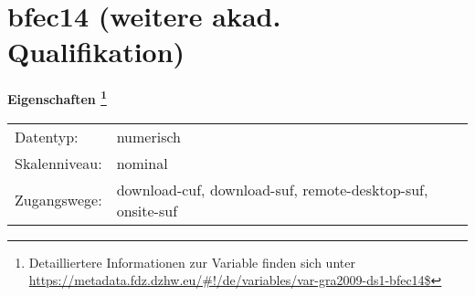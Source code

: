 
    \setcounter{footnote}{0}

    \vspace*{-1.8cm}
	\section{bfec14 (weitere akad. Qualifikation)}
	\label{section:bfec14}



    \vspace*{0.5cm}
    \noindent\textbf{Eigenschaften
	\footnote{Detailliertere Informationen zur Variable finden sich unter
		\url{https://metadata.fdz.dzhw.eu/\#!/de/variables/var-gra2009-ds1-bfec14$}}}\\
	\begin{tabularx}{\hsize}{@{}lX}
	Datentyp: & numerisch \\
	Skalenniveau: & nominal \\
	Zugangswege: &
	  download-cuf, 
	  download-suf, 
	  remote-desktop-suf, 
	  onsite-suf
 \\
    \end{tabularx}



